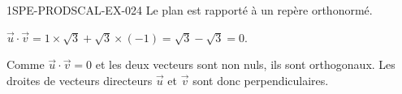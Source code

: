 \begin{corrige}{1SPE-PRODSCAL-EX-024}
Le plan est rapporté à un repère orthonormé.

$\vec{u} \cdot \vec{v} = 1 \times \sqrt{3} + \sqrt{3} \times (-1) = \sqrt{3} - \sqrt{3} = 0$.

Comme $\vec{u} \cdot \vec{v} = 0$ et les deux vecteurs sont non nuls, ils sont orthogonaux. Les droites de vecteurs directeurs $\vec{u}$ et $\vec{v}$ sont donc perpendiculaires.
\end{corrige}
